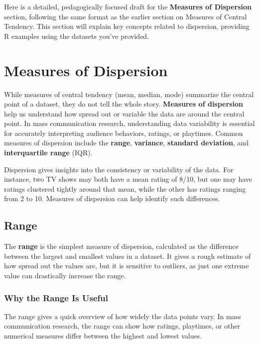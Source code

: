 \documentclass[
]{book}
\begin{document}
Here is a detailed, pedagogically focused draft for the \textbf{Measures of Dispersion} section, following the same format as the earlier section on Measures of Central Tendency. This section will explain key concepts related to dispersion, providing R examples using the datasets you've provided.

\section{Measures of Dispersion}\label{measures-of-dispersion}

While measures of central tendency (mean, median, mode) summarize the central point of a dataset, they do not tell the whole story. \textbf{Measures of dispersion} help us understand how spread out or variable the data are around the central point. In mass communication research, understanding data variability is essential for accurately interpreting audience behaviors, ratings, or playtimes. Common measures of dispersion include the \textbf{range}, \textbf{variance}, \textbf{standard deviation}, and \textbf{interquartile range} (IQR).

Dispersion gives insights into the consistency or variability of the data. For instance, two TV shows may both have a mean rating of 8/10, but one may have ratings clustered tightly around that mean, while the other has ratings ranging from 2 to 10. Measures of dispersion can help identify such differences.

\subsection*{Range}\label{range}

The \textbf{range} is the simplest measure of dispersion, calculated as the difference between the largest and smallest values in a dataset. It gives a rough estimate of how spread out the values are, but it is sensitive to outliers, as just one extreme value can drastically increase the range.

\subsubsection*{Why the Range Is Useful}\label{why-the-range-is-useful}

The range gives a quick overview of how widely the data points vary. In mass communication research, the range can show how ratings, playtimes, or other numerical measures differ between the highest and lowest values.
\end{document}
